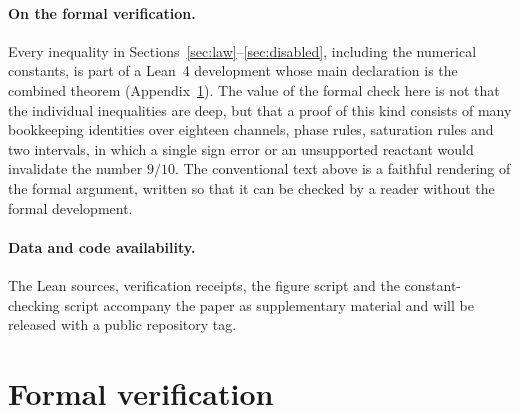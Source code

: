 \documentclass[11pt,a4paper]{article}
\theoremstyle{plain}
\theoremstyle{definition}
\theoremstyle{remark}
\begin{document}
\paragraph{On the formal verification.}
Every inequality in Sections~\ref{sec:law}--\ref{sec:disabled}, including the numerical constants, is part of a Lean~4 development whose main declaration is the combined theorem (Appendix~\ref{app:formal}). The value of the formal check here is not that the individual inequalities are deep, but that a proof of this kind consists of many bookkeeping identities over eighteen channels, phase rules, saturation rules and two intervals, in which a single sign error or an unsupported reactant would invalidate the number $9/10$. The conventional text above is a faithful rendering of the formal argument, written so that it can be checked by a reader without the formal development.

\paragraph{Data and code availability.}
The Lean sources, verification receipts, the figure script and the constant-checking script accompany the paper as supplementary material and will be released with a public repository tag.

\appendix

\section{Formal verification}\label{app:formal}
\end{document}
